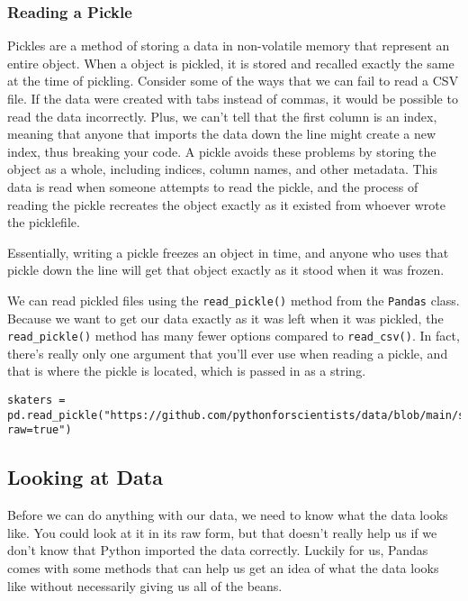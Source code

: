 \subsubsection{Reading a Pickle}
Pickles are a method of storing a data in non-volatile memory that represent an entire  object. When a  object is pickled, it is stored and recalled exactly the same at the time of pickling. Consider some of the ways that we can fail to read a CSV file. If the data were created with tabs instead of commas, it would be possible to read the data incorrectly. Plus, we can't tell  that the first column is an index, meaning that anyone that imports the data down the line might create a new index, thus breaking your code. A pickle avoids these problems by storing the object as a whole, including indices, column names, and other metadata. This data is read when someone attempts to read the pickle, and the process of reading the pickle recreates the object exactly as it existed from whoever wrote the picklefile.\par
Essentially, writing a pickle freezes an object in time, and anyone who uses that pickle down the line will get that object exactly as it stood when it was frozen.\par
We can read pickled files using the \verb|read_pickle()| method from the \verb|Pandas| class. Because we want to get our data exactly as it was left when it was pickled, the \verb|read_pickle()| method has many fewer options compared to \verb|read_csv()|. In fact, there's really only one argument that you'll ever use when reading a pickle, and that is where the pickle is located, which is passed in as a string.\par
\begin{lstlisting}[style=pippython]
skaters = pd.read_pickle("https://github.com/pythonforscientists/data/blob/main/skaters.pkl?raw=true")
\end{lstlisting}
\subsection{Looking at Data}
Before we can do anything with our data, we need to know what the data looks like. You could look at it in its raw form, but that doesn't really help us if we don't know that Python imported the data correctly. Luckily for us, Pandas comes with some methods that can help us get an idea of what the data looks like without necessarily giving us all of the beans.\par
{}
